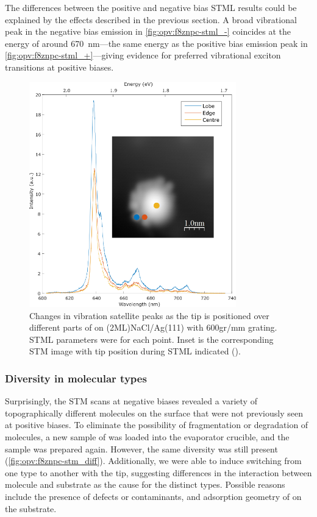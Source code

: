 The differences between the positive and negative bias \ac{STML} results could be explained by the effects described in the previous section. A broad vibrational peak in the negative bias emission in \autoref{fig:opv:f8znpc-stml_-} coincides at the energy of around \SI{670}{nm}---the same energy as the positive bias emission peak in \autoref{fig:opv:f8znpc-stml_+}---giving evidence for preferred vibrational exciton transitions at positive biases.

\begin{figure}
    \centering
        \includegraphics[width=0.8\textwidth]{pictures/f8znpc_-ve_emission_inset600_position.png}
        \caption{Changes in vibration satellite peaks as the tip is positioned over different parts of  on (2ML)NaCl/Ag(111) with 600gr/mm grating. STML parameters were  for each point. Inset is the corresponding STM image with tip position during STML indicated ().}
        \label{fig:opv:f8znpc-stml_600gr}
\end{figure}



\subsubsection*{Diversity in molecular types}


Surprisingly, the \ac{STM} scans at negative biases revealed a variety of topographically different molecules on the surface that were not previously seen at positive biases. To eliminate the possibility of fragmentation or degradation of molecules, a new sample of  was loaded into the evaporator crucible, and the sample was prepared again. However, the same diversity was still present (\autoref{fig:opv:f8znpc-stm_diff}). Additionally, we were able to induce switching from one type to another with the tip, suggesting differences in the interaction between molecule and substrate as the cause for the distinct types. Possible reasons include the presence of defects or contaminants, and adsorption geometry of  on the substrate.



